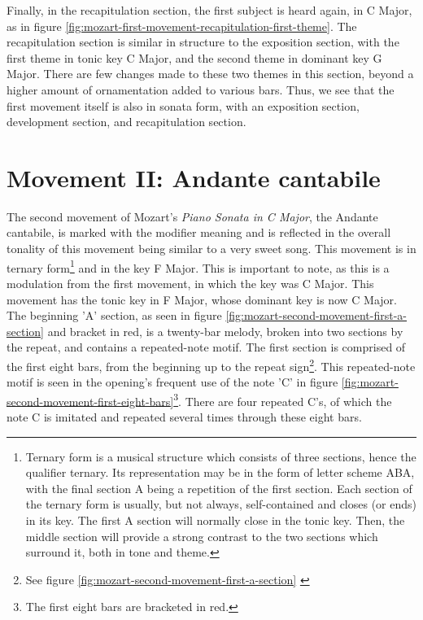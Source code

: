 Finally, in the recapitulation section, the first subject is heard again, in C Major, as in figure \ref{fig:mozart-first-movement-recapitulation-first-theme}\autocite{Henle_1977}. The recapitulation section is similar in structure to the exposition section, with the first theme in tonic key C Major, and the second theme in dominant key G Major. There are few changes made to these two themes in this section, beyond a higher amount of ornamentation added to various bars. Thus, we see that the first movement itself is also in sonata form, with an exposition section, development section, and recapitulation section.

\section{Movement II: Andante cantabile}

The second movement of Mozart's \textit{Piano Sonata in C Major}, the Andante cantabile, is marked with the modifier  meaning  and is reflected in the overall tonality of this movement being similar to a very sweet song. This movement is in ternary form\footnote{Ternary form is a musical structure which consists of three sections, hence the qualifier ternary. Its representation may be in the form of letter scheme ABA, with the final section A being a repetition of the first section. Each section of the ternary form is usually, but not always, self-contained and closes (or ends) in its key. The first A section will normally close in the tonic key. Then, the middle section will provide a strong contrast to the two sections which surround it, both in tone and theme.} and in the key F Major. This is important to note, as this is a modulation from the first movement, in which the key was C Major. This movement has the tonic key in F Major, whose dominant key is now C Major. The beginning 'A' section, as seen in figure \ref{fig:mozart-second-movement-first-a-section}\autocite{Henle_1977} and bracket in red, is a twenty-bar melody, broken into two sections by the repeat, and contains a repeated-note motif. The first section is comprised of the first eight bars, from the beginning up to the repeat sign\footnote{See figure \ref{fig:mozart-second-movement-first-a-section} \citeauthor{Henle_1977}}. This repeated-note motif is seen in the opening's frequent use of the note 'C' in figure \ref{fig:mozart-second-movement-first-eight-bars}\autocite{Henle_1977}\footnote{The first eight bars are bracketed in red.}. There are four repeated C's, of which the note C is imitated and repeated several times through these eight bars.

